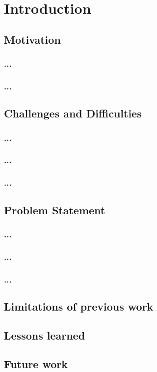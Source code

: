 

    \chapter{Introduction}

    \lipsum[1-5]
    \section{Motivation}
    \subsection{...}

    \lipsum[6-10]

    \subsection{...}


    \section{Challenges and Difficulties}
    \subsection{...}

    \lipsum[11-15]

    \subsection{...}

    \subsection{...}



    \section{Problem Statement}
    \subsection{...}

    \lipsum[21-30]

    \subsection{...}


    \subsection{...}

    
    \section{Limitations of previous work}

    
    \section{Lessons learned}

    \section{Future work} 

